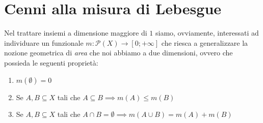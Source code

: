 \chapter{Cenni alla misura di Lebesgue}

Nel trattare insiemi a dimensione maggiore di $1$ siamo, ovviamente, interessati ad individuare un funzionale $m: \mathcal{P}(X) \to [0; +\infty]$ che riesca a generalizzare la nozione geometrica di \emph{area} che noi abbiamo a due dimensioni, ovvero che possieda le seguenti proprietà:
\begin{enumerate}[label=\protect\circled{\arabic*}]
	\item $m(\emptyset) = 0$
	\item Se $A, B \subseteq X$ tali che $A \subseteq B \implies m(A) \leq m(B)$
	\item Se $A, B \subseteq X$ tali che $A \cap B = \emptyset \implies m(A \cup B) = m(A) + m(B)$
\end{enumerate}